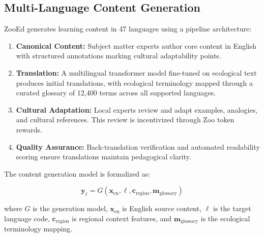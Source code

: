 \subsection{Multi-Language Content Generation}

ZooEd generates learning content in 47 languages using a pipeline architecture:

\begin{enumerate}[leftmargin=*]
    \item \textbf{Canonical Content:} Subject matter experts author core content in English with structured annotations marking cultural adaptability points.
    \item \textbf{Translation:} A multilingual transformer model fine-tuned on ecological text produces initial translations, with ecological terminology mapped through a curated glossary of 12,400 terms across all supported languages.
    \item \textbf{Cultural Adaptation:} Local experts review and adapt examples, analogies, and cultural references. This review is incentivized through Zoo token rewards.
    \item \textbf{Quality Assurance:} Back-translation verification and automated readability scoring ensure translations maintain pedagogical clarity.
\end{enumerate}

The content generation model is formalized as:

\begin{equation}
    \mathbf{y}_{\ell} = G(\mathbf{x}_{\text{en}}, \ell, \mathbf{c}_{\text{region}}, \mathbf{m}_{\text{glossary}})
\end{equation}

\noindent where $G$ is the generation model, $\mathbf{x}_{\text{en}}$ is English source content, $\ell$ is the target language code, $\mathbf{c}_{\text{region}}$ is regional context features, and $\mathbf{m}_{\text{glossary}}$ is the ecological terminology mapping.

